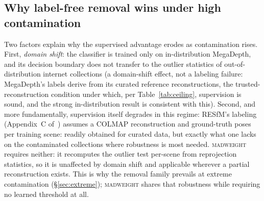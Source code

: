 \documentclass[10pt,twocolumn,letterpaper]{article}
\newcommand{\mad}{\textsc{madweight}}
\begin{document}
\subsection{Why label-free removal wins under high contamination}\label{sec:whyremoval}
Two factors explain why the supervised advantage erodes as contamination rises.
First, \emph{domain shift}: the classifier is trained only on in-distribution MegaDepth,
and its decision boundary does not transfer to the outlier statistics of
out-of-distribution internet collections (a domain-shift effect, not a labeling failure:
MegaDepth's labels derive from its curated reference reconstructions, the
trusted-reconstruction condition under which, per Table~\ref{tab:ceiling}, supervision
is sound, and the strong in-distribution result is consistent with this). Second, and more
fundamentally, supervision itself degrades in this regime: RESfM's labeling (Appendix~C
of~\cite{resfm}) assumes a COLMAP reconstruction and ground-truth poses per training
scene: readily obtained for curated data, but exactly what one lacks on the contaminated
collections where robustness is most needed. \mad{} requires neither: it recomputes the
outlier test per-scene from reprojection statistics, so it is unaffected by domain shift
and applicable wherever a partial reconstruction exists. This is why the removal family
prevails at extreme contamination (\S\ref{sec:extreme}); \mad{} shares that robustness
while requiring no learned threshold at all.
\end{document}

